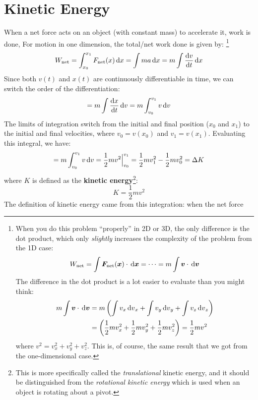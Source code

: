 \section{Kinetic Energy}
\label{sec:transKE}
When a net force acts on an object (with constant mass) to accelerate it, work
is done, For motion in one dimension, the total/net work done is given by:
\footnote{When you do this problem ``properly'' in 2D or 3D, the only
difference is the dot product, which only \emph{slightly} increases the
complexity of the problem from the 1D case:
\begin{equation*}
  W_\text{net}
  = \int\bm F_\text{net}(\bm x)\cdot\dl{\bm x}
  = \cdots = m\int\bm v\cdot\dl{\bm v}
\end{equation*}
The difference in the dot product is a lot easier to evaluate than you might
think:
\begin{align*}
  m\int\bm v\cdot\dl{\bm v}
  &=m\left(\int v_x\dl v_x + \int v_y\dl v_y + \int v_z\dl v_z\right)\\
  &=\left(\frac12mv_x^2+\frac12mv_y^2 + \frac12mv_z^2\right)
  =\frac12mv^2
\end{align*}
where $v^2=v_x^2+v_y^2+v_z^2$. This is, of course, the same result that we
got from the one-dimensional case.}
\begin{equation}
  W_\text{net}
  =\int_{x_0}^{x_1}F_\text{net}(x)\dl x
  =\int ma\dl x
  =m\int\diff vt\dl x
\end{equation}
Since both $v(t)$ and $x(t)$ are continuously differentiable in time, we can
switch the order of the differentiation:
\begin{equation*}
  =m\int\diff xt\dl v=m\int_{v_0}^{v_1}v\dl v
\end{equation*}
The limits of integration switch from the initial and final position ($x_0$ and
$x_1$) to the initial and final velocities, where $v_0=v(x_0)$ and
$v_1=v(x_1)$. Evaluating this integral, we have:
\begin{equation*}
  =m\int_{v_0}^{v_1}v\dl v
  =\frac12mv^2\Big|^{v_1}_{v_0}
  =\frac12mv_1^2-\frac12mv_0^2
  =\Delta K
\end{equation*}
where $K$ is defined as the \textbf{kinetic energy}\footnote{This is more
specifically called the \emph{translational} kinetic energy, and it should be
distinguished from the \emph{rotational kinetic energy} which is used when an
object is rotating about a pivot.}:
\begin{equation}
  \boxed{
    K=\frac12mv^2
  }
\end{equation}
The definition of kinetic energy came from this integration: when the net force
